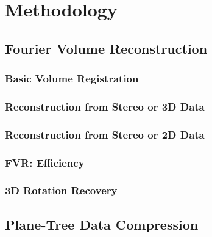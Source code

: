 \makeatletter
\chapter{Methodology}
\label{ch:Metho}


\section{Fourier Volume Reconstruction}
\label{FVRSectionA}


\subsection{Basic Volume Registration} \label{Sec:VolumeRegistrationSection}


\subsection{Reconstruction from Stereo or 3D Data} \label{Sec:AFVRApproach}


\subsection{Reconstruction from Stereo or 2D Data} 
\label{Sec:AMonoFVRApproach}


\subsection{FVR: Efficiency} \label{Sec:Efficiency}


\subsection{3D Rotation Recovery}
\label{FullRecovery3DSection}




\section{Plane-Tree Data Compression}

